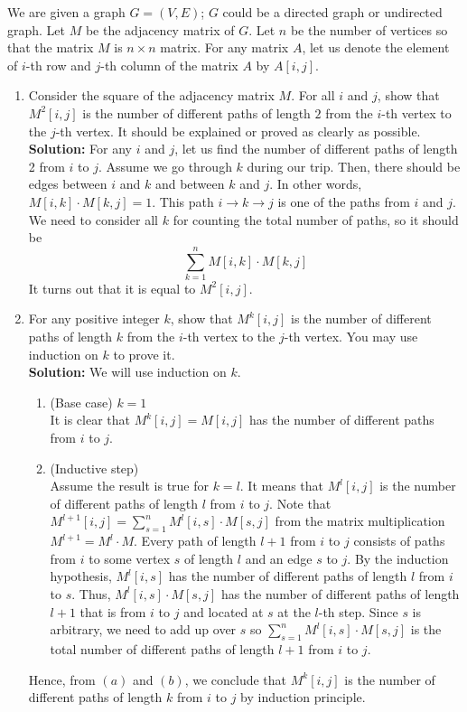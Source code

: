 \documentclass[11pt]{article}
\begin{document}
\begin{qunlist}
 We are given a graph $G = (V, E)$; $G$ could be a directed graph or undirected graph. Let $M$ be the adjacency matrix of $G$. Let $n$ be the number of vertices so that the matrix $M$ is $n \times n$ matrix. For any matrix $A$, let us denote the element of $i$-th row and $j$-th column of the matrix $A$ by $A[i, j]$.
\begin{enumerate}
    \item Consider the square of the adjacency matrix $M$. For all $i$ and $j$, show that $M^2[i, j]$ is the number of different paths of length $2$ from the $i$-th vertex to the $j$-th vertex. It should be explained or proved as clearly as possible.\\
    \textbf{Solution:} For any $i$ and $j$, let us find the number of different paths of length 2 from $i$ to $j$. Assume we go through $k$ during our trip. Then, there should be edges between $i$ and $k$ and between $k$ and $j$. In other words, $M[i,k]\cdot M[k,j] = 1$. This path $i \rightarrow k \rightarrow j$ is one of the paths from $i$ and $j$. We need to consider all $k$ for counting the total number of paths, so it should be
    \begin{equation*}
        \sum_{k=1}^n M[i,k] \cdot M[k, j]
    \end{equation*}
    It turns out that it is equal to $M^2[i, j]$.
    
    \item For any positive integer $k$, show that $M^k[i, j]$ is the number of different paths of length $k$  from the $i$-th vertex to the $j$-th vertex. You may use induction on $k$ to prove it.\\
    \textbf{Solution:} We will use induction on $k$.
    \begin{enumerate}
        \item (Base case) $k = 1$ \\ It is clear that $M^k[i,j] = M[i,j]$ has the number of different paths from $i$ to $j$.
        \item (Inductive step) \\ Assume the result is true for $k = l$. It means that $M^l[i, j]$ is the number of different paths of length $l$ from $i$ to $j$. Note that $M^{l+1}[i, j] = \sum_{s=1}^n M^l[i, s] \cdot M[s, j]$ from the matrix multiplication $M^{l+1} = M^l \cdot M$. Every path of length $l + 1$ from $i$ to $j$ consists of paths from $i$ to some vertex $s$ of length $l$ and an edge $s$ to $j$. By the induction hypothesis, $M^l[i, s]$ has the number of different paths of length $l$ from $i$ to $s$. Thus, $M^l[i, s] \cdot M[s, j]$ has the number of different paths of length $l+1$ that is from $i$ to $j$ and located at $s$ at the $l$-th step. Since $s$ is arbitrary, we need to add up over $s$ so $\sum_{s=1}^n M^l[i, s] \cdot M[s, j]$ is the total number of different paths of length $l+1$ from $i$ to $j$.
    \end{enumerate}
    Hence, from $(a)$ and $(b)$, we conclude that $M^k[i,j]$ is the number of different paths of length $k$ from $i$ to $j$ by induction principle.
    

\end{enumerate}
\end{qunlist}
\end{document}
